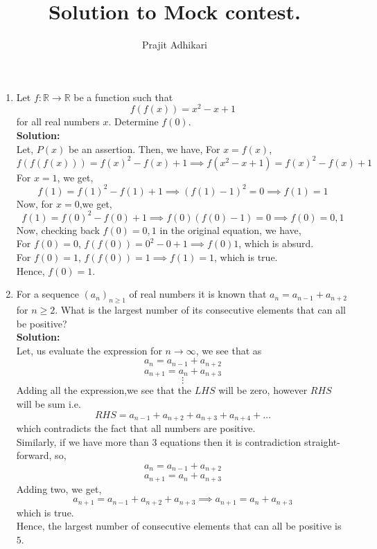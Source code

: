 \documentclass{article}
\begin{document}
\title{Solution to Mock contest.}
\author{Prajit Adhikari}
\maketitle


\begin{enumerate}
  \item Let $f : \mathbb{R} \to \mathbb{R}$ be a function such that
$$f(f(x)) = x^2 - x + 1$$
for all real numbers $x$. Determine $f(0)$.\\
\textbf{Solution:}\\
Let, $P(x)$ be an assertion. Then, we have,
For $x=f(x)$,
$$f(f(f(x)))=f(x)^2-f(x)+1 \implies f(x^2-x+1)=f(x)^2-f(x)+1$$
For $x=1$, we get,
$$f(1)=f(1)^2-f(1)+1 \implies (f(1)-1)^2=0 \implies f(1)=1$$
Now, for $x=0$,we get,
$$f(1)=f(0)^2-f(0)+1 \implies f(0)(f(0)-1)=0 \implies f(0)=0,1$$
Now, checking back $f(0)=0,1$ in the original equation, we have,\\
For $f(0)=0$, $f(f(0))=0^2-0+1 \implies f(0)1$, which is absurd.\\
For $f(0)=1$, $f(f(0))=1 \implies f(1)=1$, which is true.\\
Hence, $\boxed{f(0)=1}$.
\newpage
  \item For a sequence $(a_n)_{n \geq 1}$ of real numbers it is known that $a_n = a_{n-1} + a_{n+2}$ for $n \geq 2$. What is the largest number of its consecutive elements that can all be positive?\\
\textbf{Solution:}\\
Let, us evaluate the expression for $n \to \infty$, we see that as
$$a_n=a_{n-1}+a_{n+2}$$
$$a_{n+1}=a_{n}+a_{n+3}$$
$$\vdots$$
Adding all the expression,we see that the $LHS$ will be zero, however $RHS$ will be sum i.e.
$$RHS= a_{n-1}+a_{n+2}+a_{n+3}+a_{n+4}+\hdots$$
which contradicts the fact that all numbers are positive.\\
Similarly, if we have more than $3$ equations then it is contradiction straight-forward, so,
$$ a_{n}=a_{n-1}+a_{n+2}$$
$$a_{n+1}=a_{n}+a_{n+3}$$
Adding two, we get,
$$ a_{n+1}=a_{n-1}+a_{n+2}+a_{n+3} \implies a_{n+1}=a_n+a_{n+3}$$
which is true. \\
Hence, the largest number of consecutive elements that can all be positive is $\boxed{5}$.

\newpage



\end{enumerate}
\end{document}
